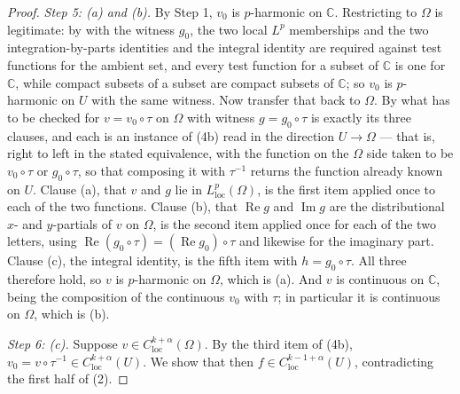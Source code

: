 \begin{proof}
\emph{Step 5: (a) and (b).}  By Step 1, $v_0$ is $p$-harmonic on $\mathbb{C}$.
Restricting to $\Omega$ is legitimate: by  with the
witness $g_0$, the two local $L^p$ memberships and the two
integration-by-parts identities and the integral identity are required against
test functions for the ambient set, and every test function for a subset of
$\mathbb{C}$ is one for $\mathbb{C}$, while compact subsets of a subset are
compact subsets of $\mathbb{C}$; so $v_0$ is $p$-harmonic on $U$ with the same
witness.  Now transfer that back to $\Omega$.  By  what
has to be checked for $v=v_0\circ\tau$ on $\Omega$ with witness
$g=g_0\circ\tau$ is exactly its three clauses, and each is an instance of (4b)
read in the direction $U\to\Omega$ --- that is, right to left in the stated
equivalence, with the function on the $\Omega$ side taken to be $v_0\circ\tau$
or $g_0\circ\tau$, so that composing it with $\tau^{-1}$ returns the function
already known on $U$.  Clause (a), that $v$ and $g$ lie in
$L^p_{\mathrm{loc}}(\Omega)$, is the first item applied once to each of the two
functions.  Clause (b), that $\operatorname{Re}g$ and $\operatorname{Im}g$ are
the distributional $x$- and $y$-partials of $v$ on $\Omega$, is the second item
applied once for each of the two letters, using
$\operatorname{Re}(g_0\circ\tau)=(\operatorname{Re}g_0)\circ\tau$ and likewise
for the imaginary part.  Clause (c), the integral identity, is the fifth item
with $h=g_0\circ\tau$.  All three therefore hold, so $v$ is $p$-harmonic on
$\Omega$, which is (a).  And $v$ is continuous on $\mathbb{C}$, being the
composition of the continuous $v_0$ with $\tau$; in particular it is continuous
on $\Omega$, which is (b).

\emph{Step 6: (c).}  Suppose $v\in C^{k+\alpha}_{\mathrm{loc}}(\Omega)$.  By the
third item of (4b), $v_0=v\circ\tau^{-1}\in C^{k+\alpha}_{\mathrm{loc}}(U)$.
We show that then $f\in C^{k-1+\alpha}_{\mathrm{loc}}(U)$, contradicting the
first half of (2).


\end{proof}
